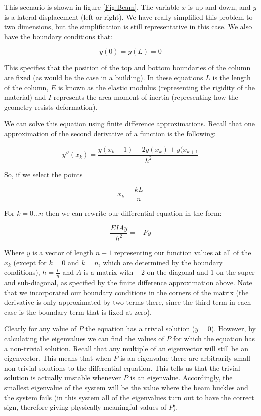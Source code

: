 This scenario is shown in figure \ref{Fig:Beam}. The variable $x$ is up and down, and $y$ is a lateral displacement (left or right). We have really simplified this problem to two dimensions, but the simplification is still representative in this case. We also have the boundary conditions that:

\[
y(0) = y(L) =0
\]

This specifies that the position of the top and bottom boundaries of the column are fixed (as would be the case in a building). In these equations $L$ is the length of the column, $E$ is known as the elastic modulus (representing the rigidity of the material) and $I$ represents the area moment of inertia (representing how the geometry resists deformation).

We can solve this equation using finite difference approximations. Recall that one approximation of the second derivative of a function is the following:

\[
y''(x_k) = \frac{y(x_k-1) - 2y(x_k) + y(x_{k+1}}{h^2}
\]

So, if we select the points

\[
x_k = \frac{kL}{n}
\]

For $k = 0\ldots n$ then we can rewrite our differential equation in the form:

\[
\frac{EIAy}{h^2} = -Py
\]

Where $y$ is a vector of length $n-1$ representing our function values at all of the $x_k$ (except for $k=0$ and $k=n$, which are determined by the boundary conditions), $h = \frac{L}{n}$ and $A$ is a matrix with $-2$ on the diagonal and $1$ on the super and sub-diagonal, as specified by the finite difference approximation above. Note that we incorporated our boundary conditions in the corners of the matrix (the derivative is only approximated by two terms there, since the third term in each case is the boundary term that is fixed at zero).

Clearly for any value of $P$ the equation has a trivial solution ($y=0$). However, by calculating the eigenvalues we can find the values of $P$ for which the equation has a non-trivial solution. Recall that any multiple of an eigenvector will still be an eigenvector. This means that when $P$ is an eigenvalue there are arbitrarily small non-trivial solutions to the differential equation. This tells us that the trivial solution is actually unstable whenever $P$ is an eigenvalue. Accordingly, the smallest eigenvalue of the system will be the value where the beam buckles and the system fails (in this system all of the eigenvalues turn out to have the correct sign, therefore giving physically meaningful values of $P$).

